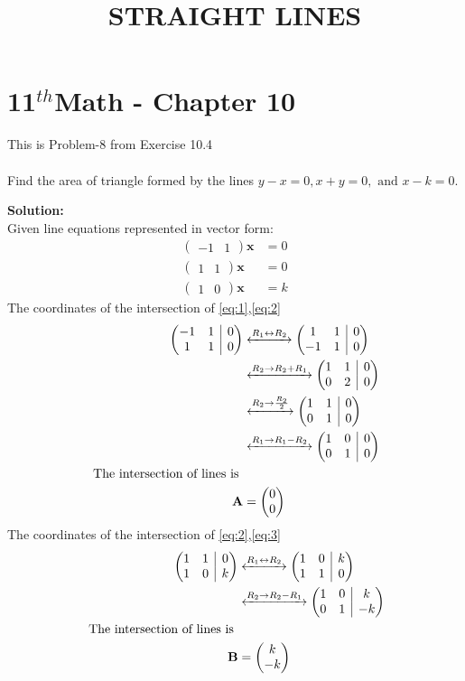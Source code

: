\documentclass[10pt]{article}
\makeatletter
\newcommand{\solution}{\noindent \textbf{Solution: }}
\newcommand{\myvec}[1]{\ensuremath{\begin{pmatrix}#1\end{pmatrix}}}
\newenvironment{amatrix}[1]{%
	\left(\begin{array}{@{}*{#1}{c}|c@{}}
}{%
	\end{array}\right)
}
\newcommand{\myaugvec}[2]{\ensuremath{\begin{amatrix}{#1}#2\end{amatrix}}}
\let\vec\mathbf{}
\makeatother
\begin{document}
\begin{center}
\title{\textbf{STRAIGHT LINES}}
\date{\vspace{-5ex}}
\maketitle
\end{center}
\section*{11$^{th}$Math - Chapter 10}
This is Problem-8 from Exercise 10.4\\\\
Find the area of triangle formed by the lines $y-x=0, x+y=0, \text{ and } x-k=0$.

\solution\\
Given line equations represented in vector form:
\begin{align}
\myvec{-1&1}\vec{x}&=0
\label{eq:1}\\
\myvec{1&1}\vec{x}&=0
\label{eq:2}\\
\myvec{1&0}\vec{x}&=k
\label{eq:3}
\end{align}
The coordinates of the intersection of \eqref{eq:1},\eqref{eq:2}
\begin{align}
	\myaugvec{2}{-1&1&0\\1&1&0} 
	&\xleftrightarrow[]{R_1\leftrightarrow R_2} \myaugvec{2}{1&1&0\\-1&1&0}\\
	&\xleftrightarrow[]{R_2\rightarrow R_2+R_1} \myaugvec{2}{1&1&0\\0&2&0}\\
	&\xleftrightarrow[]{R_2\rightarrow \frac{R_2}{2}}\myaugvec{2}{1&1&0\\0&1&0}\\
	&\xleftrightarrow[]{R_1\rightarrow R_1-R_2} \myaugvec{2}{1&0&0\\0&1&0}\\
\text{ The intersection of lines is }\\
	\vec{A}&=\myvec{0\\0}
\end{align}
The coordinates of the intersection of \eqref{eq:2},\eqref{eq:3}
\begin{align}
	\myaugvec{2}{1&1&0\\1&0&k}
	&\xleftrightarrow[]{R_1\leftrightarrow R_2}
\myaugvec{2}{1&0&k\\1&1&0}\\
	&\xleftrightarrow[]{R_2\rightarrow R_2-R_1}
\myaugvec{2}{1&0&k\\0&1&-k}\\
\text{ The intersection of lines is }\\
	\vec{B}&=\myvec{k\\-k}
\end{align}
\end{document}
